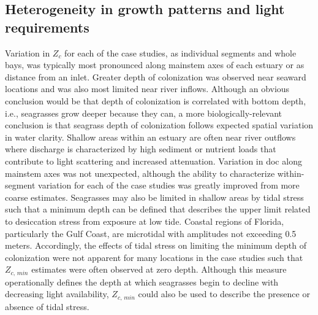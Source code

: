 \documentclass[letterpaper,12pt,oneside]{article}\usepackage[]{graphicx}\usepackage[]{color}
\begin{document}
\subsection{Heterogeneity in growth patterns and light requirements}

Variation in $Z_c$ for each of the case studies, as individual segments and whole bays, was typically most pronounced along mainstem axes of each estuary or as distance from an inlet.  Greater depth of colonization was observed near seaward locations and was also most limited near river inflows.  Although an obvious conclusion would be that depth of colonization is correlated with bottom depth, i.e., seagrasses grow deeper because they can, a more biologically-relevant conclusion is that seagrass depth of colonization follows expected spatial variation in water clarity.  Shallow areas within an estuary are often near river outflows where discharge is characterized by high sediment or nutrient loads that contribute to light scattering and increased attenuation.  Variation in \ac{doc} along mainstem axes was not unexpected, although the ability to characterize within-segment variation for each of the case studies was greatly improved from more coarse estimates.  Seagrasses may also be limited in shallow areas by tidal stress such that a minimum depth can be defined that describes the upper limit related to desiccation stress from exposure at low tide.  Coastal regions of Florida, particularly the Gulf Coast, are microtidal with amplitudes not exceeding 0.5 meters.  Accordingly, the effects of tidal stress on limiting the minimum depth of colonization were not apparent for many locations in the case studies such that $Z_{c,\,min}$ estimates were often observed at zero depth.  Although this measure operationally defines the depth at which seagrasses begin to decline with decreasing light availability, $Z_{c,\,min}$ could also be used to describe the presence or absence of tidal stress.

\end{document}

